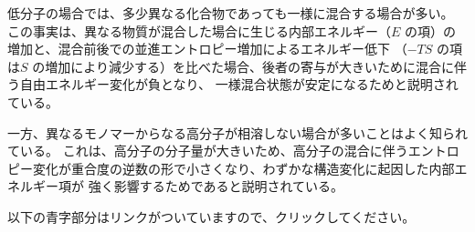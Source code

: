 \documentclass[a4paper,11pt]{ltjsarticle}
\begin{document}
\begin{itemize}
\begin{enumerate}
	低分子の場合では、多少異なる化合物であっても一様に混合する場合が多い。
	この事実は、異なる物質が混合した場合に生じる内部エネルギー（$E$ の項）の増加と、混合前後での並進エントロピー増加によるエネルギー低下
	（$-TS$ の項は$S$ の増加により減少する）を比べた場合、後者の寄与が大きいために混合に伴う自由エネルギー変化が負となり、
	一様混合状態が安定になるためと説明されている。

	一方、異なるモノマーからなる高分子が相溶しない場合が多いことはよく知られている。
	これは、高分子の分子量が大きいため、高分子の混合に伴うエントロピー変化が重合度の逆数の形で小さくなり、わずかな構造変化に起因した内部エネルギー項が
	強く影響するためであると説明されている。


	\end{enumerate}

\end{itemize}



\newpage
\begin{center}
{\Large {}}
\end{center}

以下の青字部分はリンクがついていますので、クリックしてください。
\end{document}
